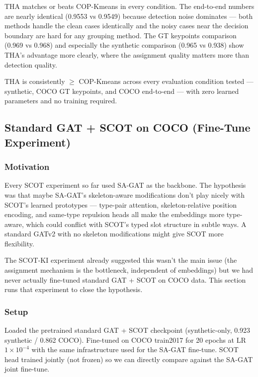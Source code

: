 \vspace{0.5em}

THA matches or beats COP-Kmeans in every condition. The end-to-end numbers are nearly identical (0.9553 vs 0.9549) because detection noise dominates --- both methods handle the clean cases identically and the noisy cases near the decision boundary are hard for any grouping method. The GT keypoints comparison (0.969 vs 0.968) and especially the synthetic comparison (0.965 vs 0.938) show THA's advantage more clearly, where the assignment quality matters more than detection quality.

THA is consistently $\geq$ COP-Kmeans across every evaluation condition tested --- synthetic, COCO GT keypoints, and COCO end-to-end --- with zero learned parameters and no training required.


\subsection{Standard GAT + SCOT on COCO (Fine-Tune Experiment)}

\subsubsection{Motivation}

Every SCOT experiment so far used SA-GAT as the backbone. The hypothesis was that maybe SA-GAT's skeleton-aware modifications don't play nicely with SCOT's learned prototypes --- type-pair attention, skeleton-relative position encoding, and same-type repulsion heads all make the embeddings more type-aware, which could conflict with SCOT's typed slot structure in subtle ways. A standard GATv2 with no skeleton modifications might give SCOT more flexibility.

The SCOT-KI experiment already suggested this wasn't the main issue (the assignment mechanism is the bottleneck, independent of embeddings) but we had never actually fine-tuned standard GAT + SCOT on COCO data. This section runs that experiment to close the hypothesis.

\subsubsection{Setup}

Loaded the pretrained standard GAT + SCOT checkpoint (synthetic-only, 0.923 synthetic / 0.862 COCO). Fine-tuned on COCO train2017 for 20 epochs at LR $1 \times 10^{-4}$ with the same infrastructure used for the SA-GAT fine-tune. SCOT head trained jointly (not frozen) so we can directly compare against the SA-GAT joint fine-tune.


